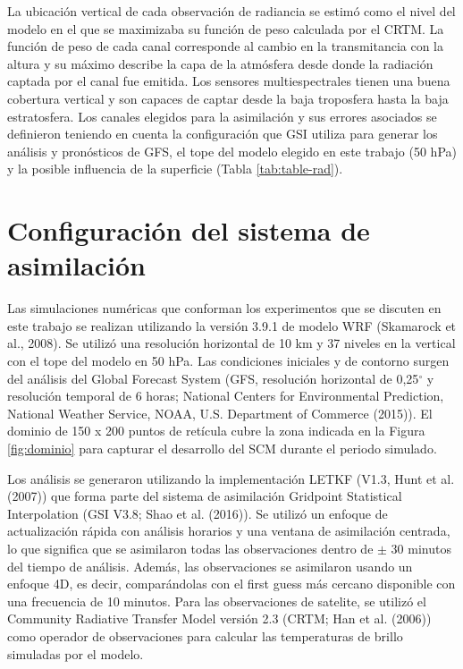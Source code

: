 \documentclass[12pt,oneside,a4paper]{reedthesis}
\begin{document}
La ubicación vertical de cada observación de radiancia se estimó como el nivel del modelo en el que se maximizaba su función de peso calculada por el CRTM. La función de peso de cada canal corresponde al cambio en la transmitancia con la altura y su máximo describe la capa de la atmósfera desde donde la radiación captada por el canal fue emitida. Los sensores multiespectrales tienen una buena cobertura vertical y son capaces de captar desde la baja troposfera hasta la baja estratosfera. Los canales elegidos para la asimilación y sus errores asociados se definieron teniendo en cuenta la configuración que GSI utiliza para generar los análisis y pronósticos de GFS, el tope del modelo elegido en este trabajo (50 hPa) y la posible influencia de la superficie (Tabla \ref{tab:table-rad}).

\hypertarget{configmodelo}{%
\section{Configuración del sistema de asimilación}\label{configmodelo}}

Las simulaciones numéricas que conforman los experimentos que se discuten en este trabajo se realizan utilizando la versión 3.9.1 de modelo WRF (Skamarock et al., 2008).
Se utilizó una resolución horizontal de 10 km y 37 niveles en la vertical con el tope del modelo en 50 hPa.
Las condiciones iniciales y de contorno surgen del análisis del Global Forecast System (GFS, resolución horizontal de 0,25\(^{\circ}\) y resolución temporal de 6 horas; National Centers for Environmental Prediction, National Weather Service, NOAA, U.S. Department of Commerce (2015)).
El dominio de 150 x 200 puntos de retícula cubre la zona indicada en la Figura \ref{fig:dominio} para capturar el desarrollo del SCM durante el periodo simulado.

Los análisis se generaron utilizando la implementación LETKF (V1.3, Hunt et al. (2007)) que forma parte del sistema de asimilación Gridpoint Statistical Interpolation (GSI V3.8; Shao et al. (2016)).
Se utilizó un enfoque de actualización rápida con análisis horarios y una ventana de asimilación centrada, lo que significa que se asimilaron todas las observaciones dentro de \(\pm\) 30 minutos del tiempo de análisis.
Además, las observaciones se asimilaron usando un enfoque 4D, es decir, comparándolas con el first guess más cercano disponible con una frecuencia de 10 minutos.
Para las observaciones de satelite, se utilizó el Community Radiative Transfer Model versión 2.3 (CRTM; Han et al. (2006)) como operador de observaciones para calcular las temperaturas de brillo simuladas por el modelo.
\end{document}
